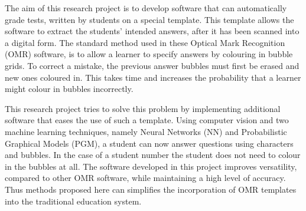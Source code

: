 


\begin{abstracts}        %
The aim of this research project is to develop software that can automatically grade tests, written by students on a special template. This template allows the software to extract the students' intended answers, after it has been scanned into a digital form. The standard method used in these Optical Mark Recognition (OMR) software, is to allow a learner to specify answers by colouring in bubble grids. To correct a mistake, the previous answer bubbles must first be erased and new ones coloured in. This takes time and increases the probability that a learner might colour in bubbles incorrectly. 

This research project tries to solve this problem by implementing additional software that eases the use of such a template. Using computer vision and two machine learning techniques, namely Neural Networks (NN) and Probabilistic Graphical Models (PGM), a student can now answer questions using characters and bubbles. In the case of a student number the student does not need to colour in the bubbles at all. The software developed in this project improves versatility, compared to other OMR software, while maintaining a high level of accuracy. Thus methods proposed here can simplifies the incorporation of OMR templates into the traditional education system.
\end{abstracts}
